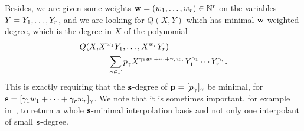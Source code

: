 \documentclass[preprint]{sig-alternate-05-2015}
\begin{document}
Besides, we are given some weights $\shifts[w] =
(\shift[w]{1},\ldots,\shift[w]{\nvars}) \in \NN^\nvars$ on the variables $Y =
Y_1,\ldots,Y_\nvars$, and we are looking for $Q(X,Y)$ which has minimal
$\shifts[w]$-weighted degree, which is the degree in $X$ of the polynomial
\begin{align*}
 Q(X,& X^{\shift[w]{1}}Y_1,\ldots,X^{\shift[w]{\nvars}}Y_\nvars) \\
 & = \sum_{\gamma \in \expSet} p_\gamma X^{\gamma_1 \shift[w]{1} + \cdots +
 \gamma_\nvars \shift[w]{\nvars}} Y_1^{\gamma_1} \cdots
 Y_\nvars^{\gamma_\nvars}.
\end{align*}
This is exactly requiring that the $\shifts$-degree of $\row{p} =
[p_\gamma]_\gamma$ be minimal, for $\shifts = [\gamma_1 \shift[w]{1} + \cdots +
\gamma_\nvars \shift[w]{\nvars}]_\gamma$. We note that it is sometimes
important, for example in~\cite{DeGoHe12a}, to return a whole $\shifts$-minimal
interpolation basis and not only one interpolant of small $\shifts$-degree. 

\begin{figure}[ht]
  \centering
{}
\end{figure}
\end{document}
